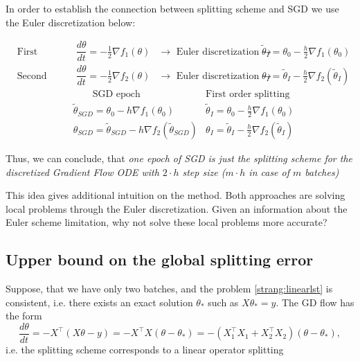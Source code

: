 \documentclass{article} %
\begin{document}
In order to establish the connection between splitting scheme and SGD we use the Euler discretization below:

\begin{align*}
&\text{First splitting step: } &\dfrac{d \theta}{d t} = -\frac{1}{2}\nabla f_1(\theta)  &\to\text{ Euler discretization}\to &\tilde{\theta}_{I} = \theta_0 - \frac{h}{2}\nabla f_1 (\theta_0) \\
&\text{Second splitting step: } &\dfrac{d \theta}{d t} = -\frac{1}{2}\nabla f_2(\theta)  &\to\text{ Euler discretization}\to &\theta_{I} = \tilde{\theta}_{I} - \frac{h}{2}\nabla f_2 (\tilde{\theta}_{I})
\end{align*}
\begin{align*}
&\qquad\text{SGD epoch} &\text{First order splitting} \\
&\tilde{\theta}_{SGD} = \theta_0 - h \nabla f_1 (\theta_0) &\tilde{\theta}_{I} = \theta_0 - \frac{h}{2}\nabla f_1 (\theta_0) \\
&\theta_{SGD} = \tilde{\theta}_{SGD} - h \nabla f_2 (\tilde{\theta}_{SGD}) &\theta_{I} = \tilde{\theta}_{I} - \frac{h}{2}\nabla f_2 (\tilde{\theta}_{I})
\end{align*}

Thus, we can conclude, that \textit{one epoch of SGD is just the splitting scheme for the discretized Gradient Flow ODE with $2 \cdot h$ step size ($m \cdot h$ in case of $m$ batches)}

This idea gives additional intuition on the method. Both approaches are solving local problems through the Euler discretization. Given an information about the Euler scheme limitation, why not solve these local problems more accurate?

\subsection{Upper bound on the global splitting error}

Suppose, that we have only two batches, and the problem \eqref{strang:linearlst} is consistent, i.e. there exists an exact solution $\theta_*$ such as $X \theta_* = y$. The GD flow has the form
\begin{equation}\label{strang:model1}
    \frac{d \theta}{d t} = -X^{\top} (X \theta - y) = -X^{\top} X(\theta - \theta_*) = -(X_1^{\top} X_1 + X^{\top}_2 X_2)(\theta - \theta_*),
\end{equation}
i.e. the splitting scheme corresponds to a linear operator splitting
\end{document}
